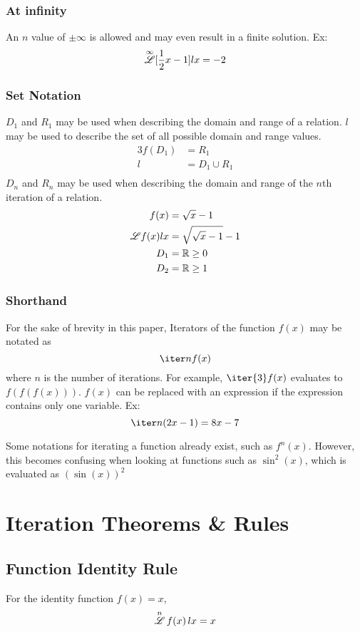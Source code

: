 \documentclass[12pt, letterpaper]{article}
\begin{document}
\subsubsection{At infinity}
An $n$ value of $\pm\infty$ is allowed and may even result in a finite solution. Ex:
$$\overset{\infty}{\mathscr{L}} [\frac{1}{2}x - 1] lx = -2$$

\subsubsection{Set Notation}
$D_1$ and $R_1$ may be used when describing the domain and range of a relation. $l$ may be used to describe the set of all possible domain and range values.
\begin{alignat*}{3}
    f(D_1)&=R_1\\
    l&=D_1\cup R_1\\
\end{alignat*}
$D_n$ and $R_n$ may be used when describing the domain and range of the $n$th iteration of a relation.
\begin{alignat*}{3}
    f(x)&=\sqrt{x}-1\\
    \overset{}{\mathscr{L}}f(x)lx &= \sqrt{\sqrt{x}-1}-1\\
    D_1 &= \mathbb{R} \ge 0\\
    D_2 &= \mathbb{R} \ge 1\\
\end{alignat*}

\subsubsection{Shorthand}
For the sake of brevity in this paper, Iterators of the function $f(x)$ may be notated as
$$\iter n {f(x)}$$ 
where $n$ is the number of iterations. For example, $\iter {3} f(x)$ evaluates to $f(f(f(x)))$. $f(x)$ can be replaced with an expression if the expression contains only one variable. Ex:
$$\iter n {(2x-1)} = 8x-7$$

Some notations for iterating a function already exist, such as $f^n(x)$. However, this becomes confusing when looking at functions such as $\sin^2(x)$, which is evaluated as $(\sin(x))^2$

\newpage
\section{Iteration Theorems \& Rules}

\subsection{Function Identity Rule}
For the identity function $f(x) = x$, 
\[
\overset{n}{\mathscr{L}} \, f(x) \, lx = x
\]
\end{document}
